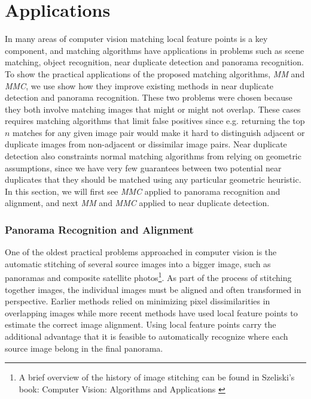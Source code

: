 \chapter{Applications}

In many areas of computer vision matching local feature points is a key 
component, and matching algorithms have applications in problems such as
scene matching, object recognition, near duplicate detection and 
panorama recognition. To show the practical applications of the proposed 
matching algorithms, \emph{MM} and \emph{MMC}, we use show how they 
improve existing methods in near duplicate detection and panorama 
recognition. These two problems were chosen because they both involve 
matching images that might or might not overlap. These cases requires 
matching algorithms that limit false positives since e.g. returning the 
top $n$ matches for any given image pair would make it hard to 
distinguish adjacent or duplicate images from non-adjacent or dissimilar
image pairs. Near duplicate detection also constraints normal matching 
algorithms from relying on geometric assumptions, since we have very few
guarantees between two potential near duplicates that they should be 
matched using any particular geometric heuristic. In this section, we 
will first see \emph{MMC} applied to panorama recognition and alignment,
and next \emph{MM} and \emph{MMC} applied to near duplicate detection.


\subsection{Panorama Recognition and Alignment}
One of the oldest practical problems approached in computer vision is 
the automatic stitching of several source images into a bigger image, 
such as panoramas and composite satellite photos\footnote{A brief 
overview of the history of image stitching can be found in Szeliski's 
book: Computer Vision: Algorithms and Applications \cite{szeliski2010}}.  
As part of the process of stitching together images, the individual 
images must be aligned and often transformed in perspective. Earlier 
methods relied on minimizing pixel dissimilarities in overlapping images 
while more recent methods have used local feature points to estimate the 
correct image alignment. Using local feature points carry the additional 
advantage that it is feasible to automatically recognize where each 
source image belong in the final panorama.

